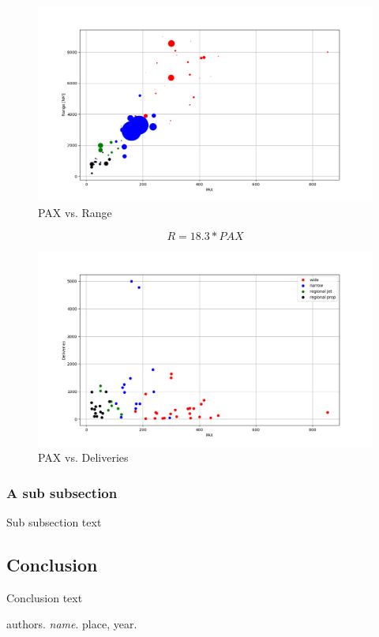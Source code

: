 \documentclass[12pt]{article} %
\begin{document}
\begin{figure}[h]
\begin{center}
\includegraphics[width=1\textwidth]{pax_v_range}
\end{center}
\caption{PAX vs. Range}
\end{figure}

\begin{equation} \label{eq:1}
R = 18.3*PAX
\end{equation}

\begin{figure}[h]
\begin{center}
\includegraphics[width=1\textwidth]{pax_v_deliveries}
\end{center}
\caption{PAX vs. Deliveries}
\end{figure}

\subsubsection{A sub subsection}

Sub subsection text

\subsection{Conclusion}

Conclusion text

\pagebreak

\begin{thebibliography}{9}
authors. 
\textit{name}. 
place, year.
\end{thebibliography}
\end{document}
